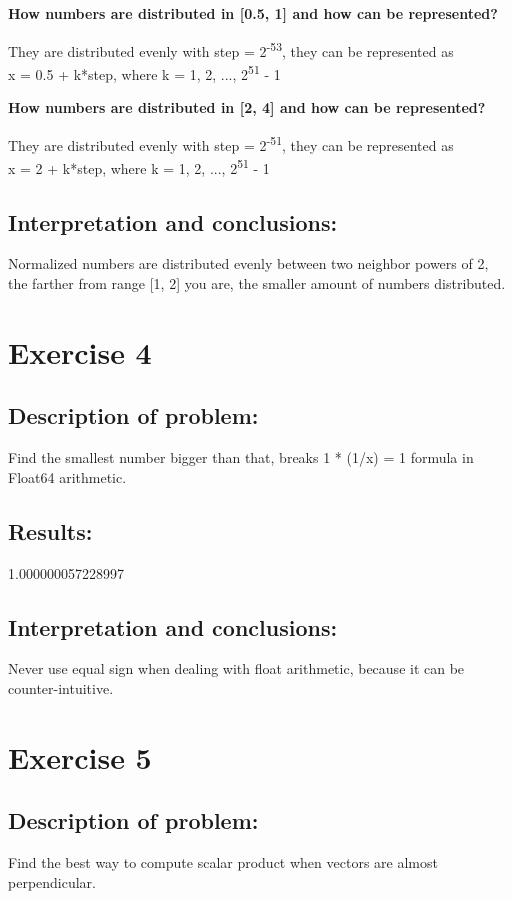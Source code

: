 \documentclass{article}
\begin{document}
\begin{center}
    \textbf{How numbers are distributed in [0.5, 1] and how can be represented?}
\end{center}
They are distributed evenly with step = 2\textsuperscript{-53}, they can be represented as\\
x = 0.5 + k*step, where k = 1, 2, ..., 2\textsuperscript{51} - 1

\begin{center}
    \textbf{How numbers are distributed in [2, 4] and how can be represented?}
\end{center}
They are distributed evenly with step = 2\textsuperscript{-51}, they can be represented as\\
x = 2 + k*step, where k = 1, 2, ..., 2\textsuperscript{51} - 1

\subsection*{Interpretation and conclusions:}
Normalized numbers are distributed evenly between two neighbor powers of 2, the farther from range [1, 2] you are, the smaller amount of numbers distributed.

\section*{Exercise 4}
\subsection*{Description of problem:}
Find the smallest number bigger than that, breaks 1 * (1/x) = 1 formula in Float64 arithmetic.

\subsection*{Results:}
1.000000057228997

\subsection*{Interpretation and conclusions:}
Never use equal sign when dealing with float arithmetic, because it can be counter-intuitive.

\section*{Exercise 5}
\subsection*{Description of problem:}
Find the best way to compute scalar product when vectors are almost perpendicular.
\end{document}
